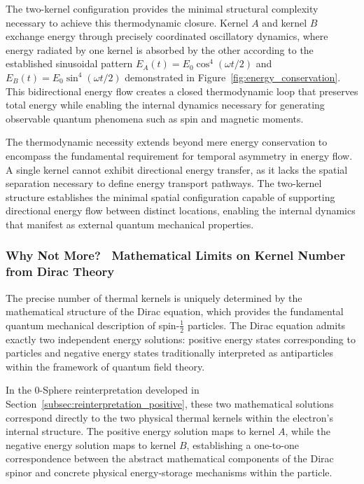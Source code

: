 \documentclass[%
 reprint,
 amsmath,amssymb,
 aps,
]{revtex4-1}
\numberwithin{equation}{section}%
\begin{document}
The two-kernel configuration provides the minimal structural complexity necessary to achieve this thermodynamic closure. Kernel $A$ and kernel $B$ exchange energy through precisely coordinated oscillatory dynamics, where energy radiated by one kernel is absorbed by the other according to the established sinusoidal pattern $E_A(t) = E_0\cos^4(\omega t/2)$ and $E_B(t) = E_0\sin^4(\omega t/2)$ demonstrated in Figure~\ref{fig:energy_conservation}. This bidirectional energy flow creates a closed thermodynamic loop that preserves total energy while enabling the internal dynamics necessary for generating observable quantum phenomena such as spin and magnetic moments.

The thermodynamic necessity extends beyond mere energy conservation to encompass the fundamental requirement for temporal asymmetry in energy flow. A single kernel cannot exhibit directional energy transfer, as it lacks the spatial separation necessary to define energy transport pathways. The two-kernel structure establishes the minimal spatial configuration capable of supporting directional energy flow between distinct locations, enabling the internal dynamics that manifest as external quantum mechanical properties.

\subsubsection{Why Not More? \ Mathematical Limits on Kernel Number from Dirac Theory} \label{subsec:why_not_more}

The precise number of thermal kernels is uniquely determined by the mathematical structure of the Dirac equation, which provides the fundamental quantum mechanical description of spin-$\frac{1}{2}$ particles. The Dirac equation admits exactly two independent energy solutions: positive energy states corresponding to particles and negative energy states traditionally interpreted as antiparticles within the framework of quantum field theory.

In the 0-Sphere reinterpretation developed in Section~\ref{subsec:reinterpretation_positive}, these two mathematical solutions correspond directly to the two physical thermal kernels within the electron's internal structure. The positive energy solution maps to kernel $A$, while the negative energy solution maps to kernel $B$, establishing a one-to-one correspondence between the abstract mathematical components of the Dirac spinor and concrete physical energy-storage mechanisms within the particle.
\end{document}
